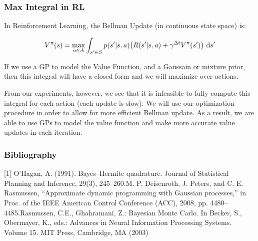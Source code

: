 \documentclass[9pt]{beamer}
\begin{document}
\begin{frame}
\frametitle{Max Integral in RL}
In Reinforcement Learning, the Bellman Update (in continuous state space) is:

\[V^{\pi}(s) = \max_{a \in A} \int_{s' \in S} p(s'|s,a)\big(R(s'|s,a) + \gamma^{\Delta t}V^{\pi}(s')\big) \ \textup{d}s' \]

If we use a GP to model the Value Function, and a Gaussain or mixture prior, then this integral will have a closed form and we will maximize over actions.

From our experiments, however, we see that it is infeasible to fully compute this integral for each action (each update is slow). We will use our optimization procedure in order to allow for more efficient Bellman update. As a result, we are able to use GPs to model the value function and make more accurate value updates in each iteration.
\end{frame}



\begin{frame}
\frametitle{Bibliography}
[1] O’Hagan, A. (1991). Bayes–Hermite quadrature. Journal of Statistical Planning and Inference, 29(3), 245–260.\newline
[2]   M.  P.  Deisenroth,  J.  Peters,  and  C.  E.  Rasmussen,  “Approximate dynamic programming with Gaussian processes,” in Proc. of the IEEE American Control Conference (ACC), 2008, pp. 4480–4485.\newline
[3] Rasmussen, C.E., Ghahramani, Z.: Bayesian Monte Carlo. In Becker, S., Obermayer, K., eds.: Advances in Neural Information Processing Systems. Volume 15. MIT Press, Cambridge, MA (2003)
\end{frame}

 
\end{document}
